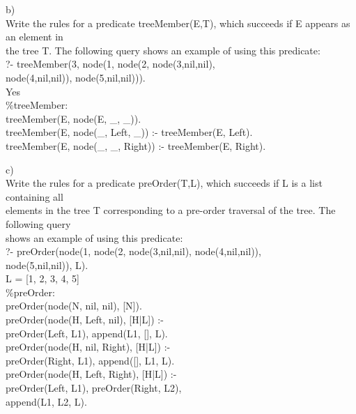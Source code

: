 \documentclass[12pt]{article}
\begin{document}
\begin{flushleft}
\qquad b)\\
\qquad Write the rules for a predicate {\selectfont treeMember(E,T)}, which succeeds if {\selectfont E} appears as an element in\\
\qquad the tree {\selectfont T}. The following query shows an example of using this predicate:\\
[2mm]
{\selectfont
\qquad \qquad ?- treeMember(3, node(1, node(2, node(3,nil,nil),\\
\qquad \qquad node(4,nil,nil)), node(5,nil,nil))).\\
\qquad \qquad Yes\\
[6mm]

\qquad \qquad \qquad \%treeMember:\\
\qquad \qquad \qquad treeMember(E, node(E, \_, \_)).\\
\qquad \qquad \qquad treeMember(E, node(\_, Left, \_)) :- treeMember(E, Left).\\
\qquad \qquad \qquad treeMember(E, node(\_, \_, Right)) :- treeMember(E, Right).\\
[2mm]
}


\qquad c)\\
\qquad Write the rules for a predicate {\selectfont preOrder(T,L)}, which succeeds if {\selectfont L} is a list containing all\\
\qquad elements in the tree {\selectfont T} corresponding to a pre-order traversal of the tree. The following query\\
\qquad shows an example of using this predicate:\\
[2mm]
{\selectfont
\qquad \qquad ?- preOrder(node(1, node(2, node(3,nil,nil), node(4,nil,nil)),\\
\qquad \qquad node(5,nil,nil)), L).\\
\qquad \qquad L = [1, 2, 3, 4, 5]\\
[6mm]	
	
\qquad \qquad \qquad \%preOrder:\\	
\qquad \qquad \qquad preOrder(node(N, nil, nil), [N]).\\
\qquad \qquad \qquad preOrder(node(H, Left, nil), [H|L]) :-\\
\qquad \qquad \qquad\qquad \qquad \qquad\qquad \qquad preOrder(Left, L1),
 append(L1, [], L).\\
\qquad \qquad \qquad preOrder(node(H, nil, Right), [H|L]) :-\\ 
\qquad \qquad \qquad\qquad \qquad \qquad\qquad \qquad preOrder(Right, L1), append([], L1, L).\\
\qquad \qquad \qquad preOrder(node(H, Left, Right), [H|L]) :-\\
\qquad \qquad \qquad \qquad \qquad \qquad preOrder(Left, L1), preOrder(Right, L2),\\
\qquad \qquad \qquad \qquad \qquad \qquad \qquad \qquad \qquad \qquad \qquad \qquad \qquad append(L1, L2, L).\\
[2mm]
}


\end{flushleft}
\end{document}
